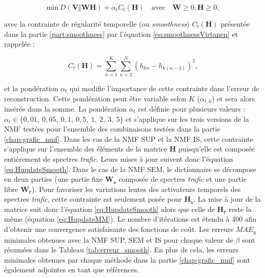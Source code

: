 \begin{equation}
\text{min}~D\left(\textbf{V} \Vert \textbf{WH}\right) + \alpha_t C_t(\mathbf{H}) \quad \text{avec} \quad \mathbf{W} \geq 0, \mathbf{H} \geq 0,
\end{equation}

avec la contrainte de régularité temporelle (ou \textit{smoothness}) $C_t(\mathbf{H})$ présentée dans la partie \ref{part:smoothness} par l'équation \ref{eq:smoothnessVirtanen} et rappelée : 

\begin{equation}
C_t(\mathbf{H}) = \sum_{n=1}^K \sum_{n=2}^N \left(h_{kn} - h_{k(n-1)}\right)^2,
\end{equation}

et la pondération $\alpha_t$ qui modifie l'importance de cette contrainte dans l'erreur de reconstruction. Cette pondération peut être variable selon $K$ ($\alpha_{t,k}$) et sera alors insérée dans la somme.
La pondération $\alpha_t$ est définie pour plusieurs valeurs : $\alpha_t \in \lbrace 0,01,~ 0,05,~ 0,1,~ 0,5,~ 1,~2,~3,~5 \rbrace$ et s'applique sur les trois versions de la NMF testées pour l'ensemble des combinaisons testées dans la partie \ref{chap:grafic_nmf}. Dans les cas de la NMF SUP et la NMF IS, cette contrainte s'applique sur l'ensemble des éléments de la matrice $\mathbf{H}$ puisqu'elle est composée entièrement de spectres \textit{trafic}. Leurs mises à jour suivent donc l'équation \ref{eq:HupdateSmooth}. Dans le cas de la NMF SEM, le dictionnaire se décompose en deux parties (une partie fixe $\mathbf{W_s}$ composée de spectres \textit{trafic} et une partie libre $\mathbf{W_r}$). Pour favoriser les variations lentes des activateurs temporels des spectres \textit{trafic}, cette contrainte est seulement posée pour $\mathbf{H_s}$. La mise à jour de la matrice suit donc l'équation \ref{eq:HupdateSmooth} alors que celle de $\mathbf{H_r}$ reste la même (équation \ref{eq:HupdateMM}). Le nombre d'itérations est étendu à 400 afin d'obtenir une convergence satisfaisante des fonctions de coût. Les erreurs $MAE_g$ minimales obtenues avec la NMF SUP, SEM et IS pour chaque valeur de $\beta$ sont résumées dans le Tableau \ref{tab:erreur_smooth}. En plus de cela, les erreurs minimales obtenues par chaque méthode dans la partie \ref{chap:grafic_nmf} sont également adjointes en tant que références.\\

